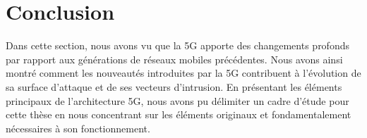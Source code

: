 \documentclass[a4paper,11pt,twoside]{StyleThese}
\begin{document}
\section{Conclusion}
Dans cette section, nous avons vu que la 5G apporte des changements profonds par rapport aux générations de réseaux mobiles précédentes. Nous avons ainsi montré comment les nouveautés introduites par la 5G contribuent à l’évolution de sa surface d’attaque et de ses vecteurs d’intrusion. En présentant les éléments principaux de l’architecture 5G, nous avons pu délimiter un cadre d’étude pour cette thèse en nous concentrant sur les éléments originaux et fondamentalement nécessaires à son fonctionnement.

\ifdefined{}
\else


\end{document}
